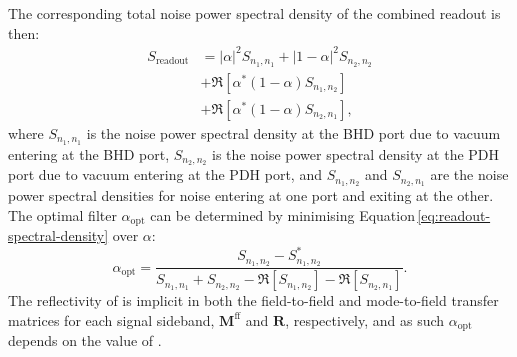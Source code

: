 The corresponding total noise power spectral density of the combined readout is then:
\begin{equation}
  \label{eq:readout-spectral-density}
  \begin{split}
    S_{\textrm{readout}} &= \left| \alpha \right|^{2} S_{n_{1},n_{1}} + \left| 1 - \alpha \right|^{2} S_{n_{2},n_{2}} \\
    &+ \Re \left[ \alpha^* \left(1 - \alpha \right) S_{n_{1},n_{2}} \right] \\
    &+ \Re \left[ \alpha^* \left(1 - \alpha \right) S_{n_{2},n_{1}} \right],
  \end{split}
\end{equation}
where $S_{n_{1},n_{1}}$ is the noise power spectral density at the \gls{BHD} port due to vacuum entering at the \gls{BHD} port, $S_{n_{2},n_{2}}$ is the noise power spectral density at the \gls{PDH} port due to vacuum entering at the \gls{PDH} port, and $S_{n_{1},n_{2}}$ and $S_{n_{2},n_{1}}$ are the noise power spectral densities for noise entering at one port and exiting at the other. The optimal filter $\alpha_{\textrm{opt}}$ can be determined by minimising Equation\,\ref{eq:readout-spectral-density} over $\alpha$:
\begin{equation}
  \label{eq:optimal-filter}
  \alpha_{\textrm{opt}} = \frac{S_{n_{1},n_{2}} - S^*_{n_{1},n_{2}}}{S_{n_{1},n_{1}} + S_{n_{2},n_{2}} - \Re \left[ S_{n_{1},n_{2}} \right] - \Re \left[ S_{n_{2},n_{1}} \right]}.
\end{equation}
The reflectivity of \MINT{} is implicit in both the field-to-field and mode-to-field transfer matrices for each signal sideband, $\mathbf{M}^{\textrm{ff}}$ and $\mathbf{R}$, respectively, and as such $\alpha_{\textrm{opt}}$ depends on the value of \MINT{}.

